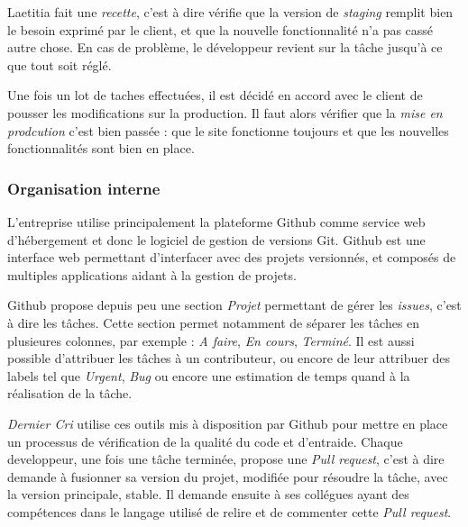 \bigskip

Laetitia fait une \emph{recette}, c'est à dire vérifie que la version de
\emph{staging} remplit bien le besoin exprimé par le client, et que la
nouvelle fonctionnalité n'a pas cassé autre chose. En cas de problème,
le développeur revient sur la tâche jusqu'à ce que tout soit réglé.

\bigskip

Une fois un lot de taches effectuées, il est décidé en accord avec le
client de pousser les modifications sur la production. Il faut alors
vérifier que la \emph{mise en prodcution} c'est bien passée : que le
site fonctionne toujours et que les nouvelles fonctionnalités sont bien
en place.

\bigskip

\subsubsection{Organisation interne}\label{organisation-interne}

\bigskip

L'entreprise utilise principalement la plateforme Github comme service
web d'hébergement et donc le logiciel de gestion de versions Git. Github
est une interface web permettant d'interfacer avec des projets
versionnés, et composés de multiples applications aidant à la gestion de
projets.

\bigskip

Github propose depuis peu une section \emph{Projet} permettant de gérer
les \emph{issues}, c'est à dire les tâches. Cette section permet
notamment de séparer les tâches en plusieures colonnes, par exemple :
\emph{A faire}, \emph{En cours}, \emph{Terminé}. Il est aussi possible
d'attribuer les tâches à un contributeur, ou encore de leur attribuer
des labels tel que \emph{Urgent}, \emph{Bug} ou encore une estimation de
temps quand à la réalisation de la tâche.

\bigskip

\emph{Dernier Cri} utilise ces outils mis à disposition par Github pour
mettre en place un processus de vérification de la qualité du code et
d'entraide. Chaque developpeur, une fois une tâche terminée, propose une
\emph{Pull request}, c'est à dire demande à fusionner sa version du
projet, modifiée pour résoudre la tâche, avec la version principale,
stable. Il demande ensuite à ses collégues ayant des compétences dans le
langage utilisé de relire et de commenter cette \emph{Pull request}.

\bigskip

